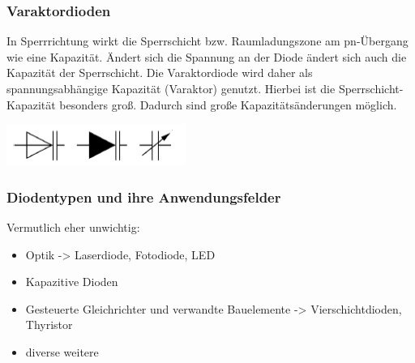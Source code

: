 	\subsubsection{Varaktordioden}
		In Sperrrichtung wirkt die Sperrschicht bzw. Raumladungszone am pn-Übergang wie eine Kapazität.
		Ändert sich die Spannung an der Diode ändert sich auch die Kapazität der Sperrschicht.
		Die Varaktordiode wird daher als spannungsabhängige Kapazität (Varaktor) genutzt.
		Hierbei ist die Sperrschicht-Kapazität
		besonders groß. Dadurch sind große Kapazitätsänderungen möglich.
		\begin{center}
			\includegraphics[width=0.3\linewidth]{Kapitel/Kap08/Varaktordiode}
		\end{center}
		
	
	\subsubsection{Diodentypen und ihre Anwendungsfelder}
		Vermutlich eher unwichtig:
		\begin{itemize}
			\item Optik -> Laserdiode, Fotodiode, LED
			\item Kapazitive Dioden
			\item Gesteuerte Gleichrichter und verwandte Bauelemente -> Vierschichtdioden, Thyristor
			\item diverse weitere
		\end{itemize}


